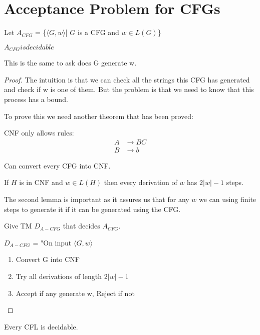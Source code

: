 \section{Acceptance Problem for CFGs}
\begin{theorem}
    Let \(A_{CFG}\) = \{\(\langle G, w \rangle \)| \(G\) is a CFG and \(w \in L(G)\)\} 

    \(A_{CFG} is decidable \) 
\end{theorem}
This is the same to ask does G generate w.
\begin{proof}
    The intuition is that we can check all the strings this CFG has generated and check if w is one of them. But the problem is that we need to know that this process has a bound.   

    To prove this we need another theorem that has been proved:
    \begin{theorem}
        CNF only allows rules:
        \begin{align*}
            A &\rightarrow BC\\
            B &\rightarrow b
        \end{align*}
    \end{theorem}
    \begin{lemma}
        Can convert every CFG into CNF.
    \end{lemma}
    \begin{lemma}
        If \(H\) is in CNF and \(w \in L(H)\) then every derivation of \(w\) has \(2 |w| - 1\) steps.  
    \end{lemma}

    The second lemma is important as it assures us that for any \(w\) we can using finite steps to generate it if it can be generated using the CFG.

   Give TM \(D_{A-CFG}\) that decides \(A_{CFG}\).  

   \(D_{A-CFG}\) = "On input \(\langle G, w \rangle\) 
   \begin{enumerate}
    \item Convert G into CNF
    \item Try all derivations of length \(2|w| - 1\) 
    \item Accept if any generate w, Reject if not
   \end{enumerate}
\end{proof}

\begin{corollary}
    Every CFL is decidable.
\end{corollary}

